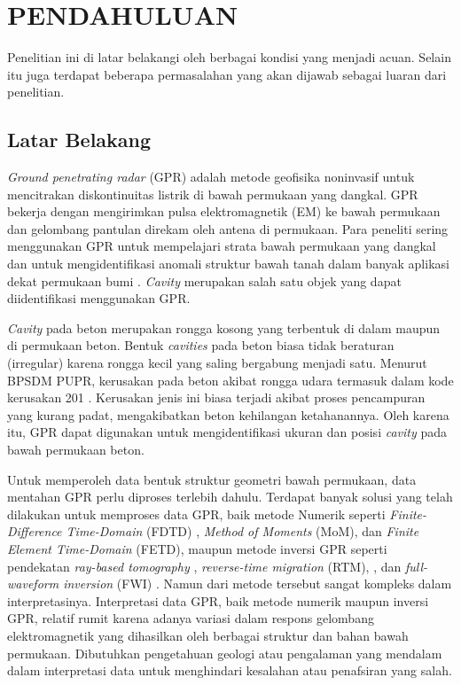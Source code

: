 \chapter{PENDAHULUAN}
\label{chap:pendahuluan}


Penelitian ini di latar belakangi oleh berbagai kondisi yang menjadi acuan. 
Selain itu juga terdapat beberapa permasalahan yang akan dijawab sebagai luaran dari penelitian.


\section{Latar Belakang}
\label{sec:latarbelakang}

\emph{Ground penetrating radar} (GPR) adalah metode geofisika noninvasif untuk mencitrakan diskontinuitas listrik di bawah permukaan yang dangkal. 
GPR bekerja dengan mengirimkan pulsa elektromagnetik (EM) ke bawah permukaan dan gelombang pantulan direkam oleh antena di permukaan. 
Para peneliti sering menggunakan GPR untuk mempelajari strata bawah permukaan yang dangkal dan untuk mengidentifikasi anomali struktur bawah tanah dalam banyak aplikasi dekat permukaan bumi \parencite{NEAL2004261}. 
\emph{Cavity} merupakan salah satu objek yang dapat diidentifikasi menggunakan GPR.

\emph{Cavity} pada beton merupakan rongga kosong yang terbentuk di dalam maupun di permukaan beton. 
Bentuk \emph{cavities} pada beton biasa tidak beraturan (irregular) karena rongga kecil yang saling bergabung menjadi satu. 
Menurut BPSDM PUPR, kerusakan pada beton akibat rongga udara termasuk dalam kode kerusakan 201 \parencite{jenisKerusakanJembatan}. 
Kerusakan jenis ini biasa terjadi akibat proses pencampuran yang kurang padat, mengakibatkan beton kehilangan ketahanannya. 
Oleh karena itu, GPR dapat digunakan untuk mengidentifikasi ukuran dan posisi \emph{cavity} pada bawah permukaan beton.

Untuk memperoleh data bentuk struktur geometri bawah permukaan, data mentahan GPR perlu diproses terlebih dahulu. 
Terdapat banyak solusi yang telah dilakukan untuk memproses data GPR, baik metode Numerik seperti \emph{Finite-Difference Time-Domain} (FDTD) \parencite{FDTD}, \emph{Method of Moments} (MoM)\parencite{MoM}, dan \emph{Finite Element Time-Domain} (FETD)\parencite{FETD}, 
maupun metode inversi GPR seperti pendekatan \emph{ray-based tomography} \parencite{tomograms}, \emph{reverse-time migration} (RTM), \parencite{RTM}, dan \emph{full-waveform inversion} (FWI) \parencite{FWI}.
Namun dari metode tersebut sangat kompleks dalam interpretasinya. 
Interpretasi data GPR, baik metode numerik maupun inversi GPR, relatif rumit karena adanya variasi dalam respons gelombang elektromagnetik yang dihasilkan oleh berbagai struktur dan bahan bawah permukaan. 
Dibutuhkan pengetahuan geologi atau pengalaman yang mendalam dalam interpretasi data untuk menghindari kesalahan atau penafsiran yang salah.

